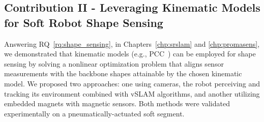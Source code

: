 \subsection{Contribution II - Leveraging Kinematic Models for Soft Robot Shape Sensing}
Answering \gls{RQ}~\ref{rq:shape_sensing}, in Chapters~\ref{chp:srslam} and \ref{chp:promasens}, we demonstrated that kinematic models (e.g., \gls{PCC}~\citep{webster2010design}) can be employed for shape sensing by solving a nonlinear optimization problem that aligns sensor measurements with the backbone shapes attainable by the chosen kinematic model. We proposed two approaches: one using cameras, the robot perceiving and tracking its environment combined with \gls{vSLAM} algorithms, and another utilizing embedded magnets with magnetic sensors. Both methods were validated experimentally on a pneumatically-actuated soft segment.

